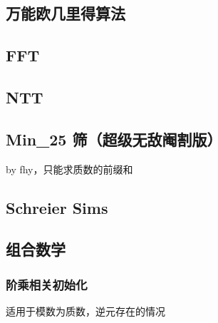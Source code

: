 \documentclass[12pt]{article}
\begin{document}


\newpage

\subsection{万能欧几里得算法}



\newpage

\subsection{FFT}



\newpage

\subsection{NTT}



\newpage


\subsection{Min\_25 筛（超级无敌阉割版）}

by fhy，只能求质数的前缀和



\newpage

\subsection{Schreier Sims}



\newpage

\subsection{组合数学}

\subsubsection{阶乘相关初始化}

适用于模数为质数，逆元存在的情况
\end{document}
